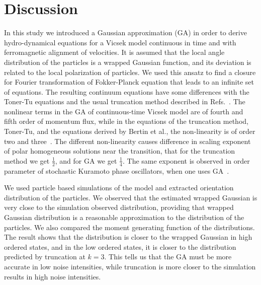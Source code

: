 \documentclass[reprint,floatfix,amsmath,amssymb,aps,pre,showkeys,showpacs,superscriptaddress]{revtex4-1}
\begin{document}
\section{Discussion}

In this study we introduced a Gaussian approximation (GA) in order to derive hydro-dynamical equations for a Vicsek model continuous in time and with ferromagnetic alignment of velocities. It is assumed that the local angle distribution of the particles is a wrapped Gaussian function, and its deviation is related to the local polarization of particles. We used this ansatz to find a closure for Fourier transformation of Fokker-Planck equation that leads to an infinite set of equations. The resulting continuum equations have some differences with the Toner-Tu equations and the usual truncation method described in Refs.~\cite{Bertin2006,Bertin2009}. The nonlinear terms in the GA of continuous-time Vicsek model are of fourth and fifth order of momentum flux, while in the equations of the truncation method, Toner-Tu, and the equations derived by Bertin et al., the non-linearity is of order two and three~\cite{Bertin2006,Bertin2009,Toner1995}. The different non-linearity causes difference in scaling exponent of polar homogeneous solutions near the transition, that for the truncation method we get $\frac{1}{2}$, and for GA we get $\frac{1}{4}$. The same exponent is observed in order parameter of stochastic Kuramoto phase oscillators, when one uses GA~\cite{sonnenschein2013approximate,sonnenschein2013excitable,sonnenschein2014cooperative,Sonnenschein2015}.

We used particle based simulations of the model and extracted orientation distribution of the particles. We observed that the estimated wrapped Gaussian is very close to the simulation observed distribution, providing that  wrapped Gaussian distribution is a reasonable approximation to the distribution of the particles. We also compared the moment generating function of the distributions. The result shows that the distribution is closer to the wrapped Gaussian in high ordered states, and in the low ordered states, it is closer to the distribution predicted by truncation at $k=3$. This tells us that the GA must be more accurate in low noise intensities, while truncation is more closer to the simulation results in high noise intensities.
\end{document}
